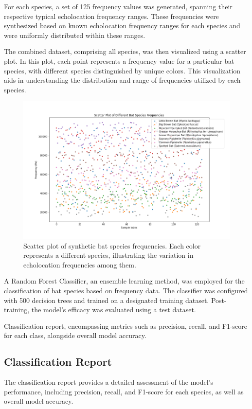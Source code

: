 \documentclass[12pt]{article}
\begin{document}
For each species, a set of 125 frequency values was generated, spanning their respective typical echolocation frequency ranges. These frequencies were synthesized based on known echolocation frequency ranges for each species and were uniformly distributed within these ranges.

The combined dataset, comprising all species, was then visualized using a scatter plot. In this plot, each point represents a frequency value for a particular bat species, with different species distinguished by unique colors. This visualization aids in understanding the distribution and range of frequencies utilized by each species.

\begin{figure}[ht]
\centering
\includegraphics[width=1\textwidth]{bat_species_freq.png}
\caption{Scatter plot of synthetic bat species frequencies. Each color represents a different species, illustrating the variation in echolocation frequencies among them.}
\end{figure}

A Random Forest Classifier, an ensemble learning method, was employed for the classification of bat species based on frequency data. The classifier was configured with 500 decision trees and trained on a designated training dataset. Post-training, the model's efficacy was evaluated using a test dataset.

Classification report, encompassing metrics such as precision, recall, and F1-score for each class, alongside overall model accuracy.

\subsection{Classification Report}
The classification report provides a detailed assessment of the model's performance, including precision, recall, and F1-score for each species, as well as overall model accuracy.
\end{document}
